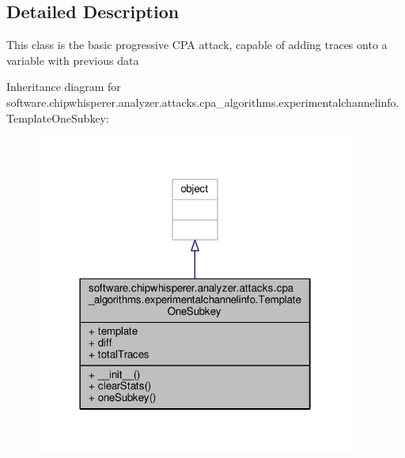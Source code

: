\subsection{Detailed Description}
\begin{DoxyVerb}This class is the basic progressive CPA attack, capable of adding traces onto a variable with previous data\end{DoxyVerb}
 

Inheritance diagram for software.\+chipwhisperer.\+analyzer.\+attacks.\+cpa\+\_\+algorithms.\+experimentalchannelinfo.\+Template\+One\+Subkey\+:\nopagebreak
\begin{figure}[H]
\begin{center}
\leavevmode
\includegraphics[width=298pt]{df/d19/classsoftware_1_1chipwhisperer_1_1analyzer_1_1attacks_1_1cpa__algorithms_1_1experimentalchanneli0e39dbd209b9d0247c83cb610f9ca56d}
\end{center}
\end{figure}


